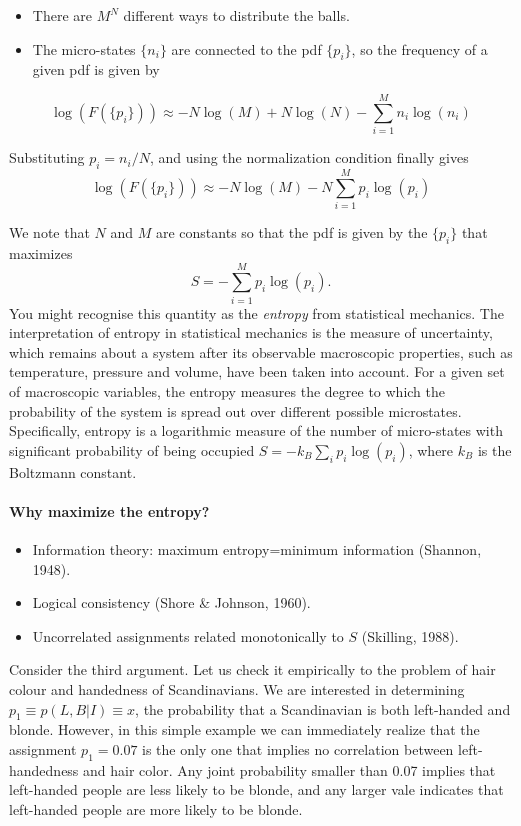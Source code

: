 \documentclass[%
oneside,                 %
final,                   %
10pt]{article}
\begin{document}
\begin{itemize}
\item There are $M^N$ different ways to distribute the balls.

\item The micro-states $\{ n_i\}$ are connected to the pdf $\{ p_i \}$, so the frequency of a given pdf is given by
\end{itemize}

\noindent
\[
\log(F(\{p_i\})) \approx -N \log(M) + N\log(N) - \sum_{i=1}^M n_i\log(n_i)
\]

Substituting $p_i = n_i/N$, and using the normalization condition finally gives
\[
\log(F(\{p_i\})) \approx -N \log(M) - N \sum_{i=1}^M p_i\log(p_i)
\]

We note that $N$ and $M$ are constants so that the pdf is given by the $\{ p_i \}$ that maximizes
\[
S = - \sum_{i=1}^M p_i\log(p_i).
\]
You might recognise this quantity as the \emph{entropy} from statistical mechanics. The interpretation of entropy in statistical mechanics is the measure of uncertainty, which remains about a system after its observable macroscopic properties, such as temperature, pressure and volume, have been taken into account. For a given set of macroscopic variables, the entropy measures the degree to which the probability of the system is spread out over different possible microstates. Specifically, entropy is a logarithmic measure of the number of micro-states with significant probability of being occupied $S = -k_B \sum_i p_i \log(p_i)$, where $k_B$ is the Boltzmann constant.

\paragraph{Why maximize the entropy?}
\begin{itemize}
\item Information theory: maximum entropy=minimum information (Shannon, 1948).

\item Logical consistency (Shore {\&} Johnson, 1960).

\item Uncorrelated assignments related monotonically to $S$ (Skilling, 1988).
\end{itemize}

\noindent
Consider the third argument. Let us check it empirically to the problem of hair colour and handedness of Scandinavians. We are interested in determining $p_1 \equiv p(L,B|I) \equiv x$, the probability that a Scandinavian is both left-handed and blonde. However, in this simple example we can immediately realize that the assignment $p_1=0.07$ is the only one that implies no correlation between left-handedness and hair color. Any joint probability smaller than 0.07 implies that left-handed people are less likely to be blonde, and any larger vale indicates that left-handed people are more likely to be blonde.
\end{document}
